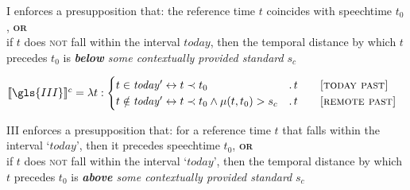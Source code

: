 \gls{I} enforces a presupposition that: the reference time $ t $ coincides with speech\-time $ t_0 $, \textbf{\textsc{or}}\\ if $ t $ does \textsc{not} fall within the interval $ \mathit{today} $, then the temporal distance by which $ t $ precedes $ t_0 $ is \textit{\textbf{below} some contextually provided standard} $ s_c $

\a$\llbracket\gls{III}\rrbracket^{c}=\lambda t:\begin{cases}t\in \mathit{today'}\leftrightarrow t\prec t_0&.\,t\qquad\textsc{[today past]}\\
	t\notin \mathit{today'} \leftrightarrow t\prec t_0\wedge\mu(t,t_0)>s_c&.\,t\qquad\textsc{[remote past]}
\end{cases}$

\gls{III} enforces a presupposition that: for a reference time $ t $ that falls within the interval `$ today $', then it precedes speechtime $ t_0 $, \textbf{\textsc{or}}\\ if $ t $ does \textsc{not} fall within the interval `$ today $', then the temporal distance by which $ t $ precedes $ t_0 $ is \textit{\textbf{above} some contextually provided standard} $ s_c $
\xe
%
%
%
%
%
%

